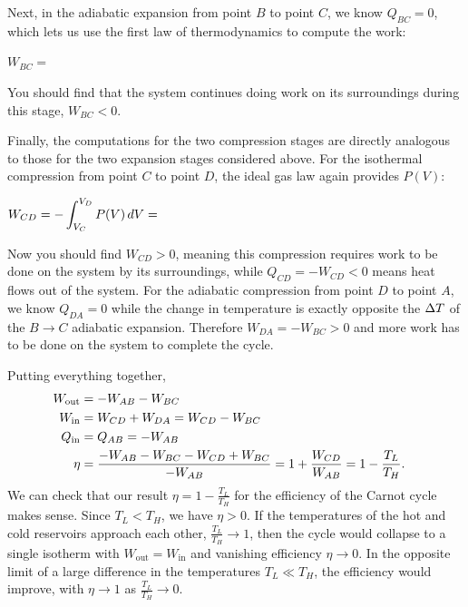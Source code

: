 Next, in the adiabatic expansion from point $B$ to point $C$, we know $Q_{BC} = 0$, which lets us use the first law of thermodynamics to compute the work:
\begin{mdframed}
  $\displaystyle W_{BC} = $ \\[75 pt]
\end{mdframed}
You should find that the system continues doing work on its surroundings during this stage, $W_{BC} < 0$.

Finally, the computations for the two compression stages are directly analogous to those for the two expansion stages considered above.
For the isothermal compression from point $C$ to point $D$, the ideal gas law again provides $P(V)$:
\begin{mdframed}
  $\displaystyle W_{CD} = -\int_{V_C}^{V_D} P(V) \mathop{dV} = $ \\[75 pt]
\end{mdframed}
Now you should find $W_{CD} > 0$, meaning this compression requires work to be done on the system by its surroundings, while $Q_{CD} = -W_{CD} < 0$ means heat flows out of the system.
For the adiabatic compression from point $D$ to point $A$, we know $Q_{DA} = 0$ while the change in temperature is exactly opposite the $\Delta T$ of the $B \to C$ adiabatic expansion.
Therefore $W_{DA} = -W_{BC} > 0$ and more work has to be done on the system to complete the cycle.

Putting everything together,
\begin{align}
  W_{\text{out}} & = -W_{AB} - W_{BC} \cr
  W_{\text{in}} & = W_{CD} + W_{DA} = W_{CD} - W_{BC} \cr
  Q_{\text{in}} & = Q_{AB} = -W_{AB} \cr
  \eta & = \frac{-W_{AB} - W_{BC} - W_{CD} + W_{BC}}{-W_{AB}} = 1 + \frac{W_{CD}}{W_{AB}} = 1 - \frac{T_L}{T_H}.
\end{align}
We can check that our result $\eta = 1 - \frac{T_L}{T_H}$ for the efficiency of the Carnot cycle makes sense.
Since $T_L < T_H$, we have $\eta > 0$.
If the temperatures of the hot and cold reservoirs approach each other, $\frac{T_L}{T_H} \to 1$, then the cycle would collapse to a single isotherm with $W_{\text{out}} = W_{\text{in}}$ and vanishing efficiency $\eta \to 0$.
In the opposite limit of a large difference in the temperatures $T_L \ll T_H$, the efficiency would improve, with $\eta \to 1$ as $\frac{T_L}{T_H} \to 0$.

